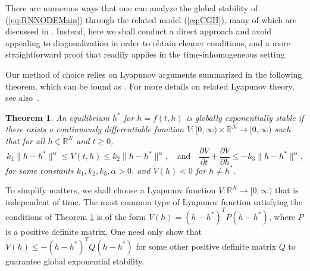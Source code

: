 \documentclass{article} \usepackage{iclr2021_conference,times}
\newtheorem{theorem}{Theorem}
\begin{document}
There are numerous ways that one can analyze the global stability of (\ref{eq:RNNODEMain}) through the related model (\ref{eq:CGH}), many of which are discussed in \cite{zhang2014comprehensive}. Instead, here we shall conduct a direct approach and avoid appealing to diagonalization in order to obtain cleaner conditions, and a more straightforward proof that readily applies in the time-inhomogeneous setting.

Our method of choice relies on Lyapunov arguments summarized in the following theorem, which can be found as \cite[Theorem 4.10]{khalil2002nonlinear}. For more details on related Lyapunov theory, see also~\cite{hahn1967stability, sastry2013nonlinear}.
\begin{theorem}
\label{thm:Lyapunov}
	An equilibrium $h^*$ for $\dot{h}=f(t, h)$ is globally exponentially stable if there exists a continuously differentiable function $V:[0,\infty)\times \mathbb{R}^N \to [0,\infty)$ such that for all $h \in \mathbb{R}^N$ and $t \geq 0$,
	\[
	k_1 \|h - h^\ast\|^{\alpha} \leq V(t,h) \leq k_2 \|h - h^\ast\|^{\alpha}, \quad\mbox{and}\quad \frac{\partial V}{\partial t} + \frac{\partial V}{\partial h} \leq -k_3 \|h - h^\ast\|^{\alpha},
	\]
	for some constants $k_1,k_2,k_3,\alpha > 0$.
	and $\dot{V}(h) < 0$ for $h \neq h^\ast$. 
\end{theorem}

To simplify matters, we shall choose a Lyapunov function $V:\mathbb{R}^N\to[0,\infty)$ that is independent of time. The most common type of Lyapunov function satisfying the conditions of Theorem \ref{thm:Lyapunov} is of the form $V(h) = (h - h^\ast)^T P (h - h^\ast)$, where $P$ is a positive definite matrix. One need only show that $\dot{V}(h) \leq -(h-h^\ast)^T Q (h-h^\ast)$ for some other positive definite matrix $Q$ to guarantee global exponential stability.
\end{document}
